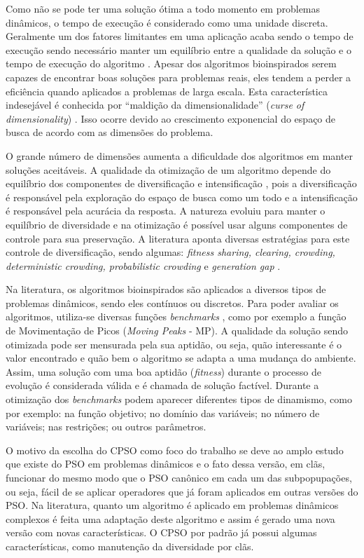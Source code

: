 Como não se pode ter uma solução ótima a todo momento em problemas dinâmicos, o tempo de execução é considerado como uma unidade discreta. Geralmente um dos fatores limitantes em uma aplicação acaba sendo o tempo de execução sendo necessário manter um equilíbrio entre a qualidade da solução e o tempo de execução do algoritmo \cite{li2006new}. Apesar dos algoritmos bioinspirados serem capazes de encontrar boas soluções para problemas reais, eles tendem a perder a eficiência quando aplicados a problemas de larga escala. Esta característica indesejável é conhecida por “maldição da dimensionalidade” (\textit{curse of dimensionality}) \cite{bellman2015applied}. Isso ocorre devido ao crescimento exponencial do espaço de busca de acordo com as dimensões do problema.

O grande número de dimensões aumenta a dificuldade dos algoritmos em manter soluções aceitáveis. A qualidade da otimização de um algoritmo depende do equilíbrio dos componentes de diversificação e intensificação \cite{boussaid2013survey}, pois a diversificação é responsável pela exploração do espaço de busca como um todo e a intensificação é responsável pela acurácia da resposta. A natureza evoluiu para manter o equilíbrio de diversidade e na otimização é possível usar alguns componentes de controle para sua preservação. A literatura aponta diversas estratégias para este controle de diversificação, sendo algumas: \textit{fitness sharing, clearing, crowding, deterministic crowding, probabilistic crowding} e \textit{generation gap} \cite{andre2015multiple}.

Na literatura, os algoritmos bioinspirados são aplicados a diversos tipos de problemas dinâmicos, sendo eles contínuos ou discretos. Para poder avaliar os algoritmos, utiliza-se diversas funções \textit{benchmarks} \cite{moser2007review}, como por exemplo a função de Movimentação de Picos (\textit{Moving Peaks} - MP). A qualidade da solução sendo otimizada pode ser mensurada pela sua aptidão, ou seja, quão interessante é o valor encontrado e quão bem o algoritmo se adapta a uma mudança do ambiente. Assim, uma solução com uma boa aptidão (\textit{fitness}) durante o processo de evolução é considerada válida e é chamada de solução factível. Durante a otimização dos \textit{benchmarks} podem aparecer diferentes tipos de dinamismo, como por exemplo: na função objetivo; no domínio das variáveis; no número de variáveis; nas restrições; ou outros parâmetros.

O motivo da escolha do CPSO como foco do trabalho se deve ao amplo estudo que existe do PSO em problemas dinâmicos e o fato dessa versão, em clãs, funcionar do mesmo modo que o PSO canônico em cada um das subpopupações, ou seja, fácil de se aplicar operadores que já foram aplicados em outras versões do PSO. Na literatura, quanto um algoritmo é aplicado em problemas dinâmicos complexos é feita uma adaptação deste algoritmo e assim é gerado uma nova versão com novas características. O CPSO por padrão já possui algumas características, como manutenção da diversidade por clãs.

